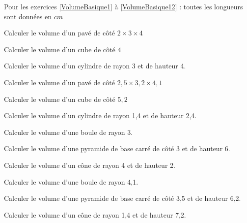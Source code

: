 Pour les exercices \ref{VolumeBasique1} à \ref{VolumeBasique12} : toutes les longueurs sont données en $cm$

\begin{multicols}{3}
    
    Calculer le volume d'un pavé de côté $2\times 3\times 4$
    
    
    Calculer le volume d'un cube de côté $4$
    
    
    Calculer le volume d'un cylindre de rayon 3 et de hauteur 4.
\end{multicols}

\begin{multicols}{3}
    
    Calculer le volume d'un pavé de côté $2,5\times 3,2\times 4,1$
    
    
    Calculer le volume d'un cube de côté $5,2$
    
    
    Calculer le volume d'un cylindre de rayon 1,4 et de hauteur 2,4.
\end{multicols}

\begin{multicols}{3}
    
    Calculer le volume d'une boule de rayon 3.
    
    
    Calculer le volume d'une pyramide de base carré de côté 3 et de hauteur 6.
    
    
    Calculer le volume d'un cône de rayon 4 et de hauteur 2.
\end{multicols}

\begin{multicols}{3}
    
    Calculer le volume d'une boule de rayon 4,1.
    
    
    Calculer le volume d'une pyramide de base carré de côté 3,5 et de hauteur 6,2.
    
    
    Calculer le volume d'un cône de rayon 1,4 et de hauteur 7,2.
\end{multicols}
